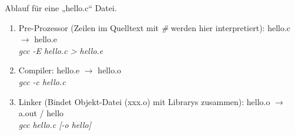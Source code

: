 



\pagestyle{empty}


\begin{multicols*}{3}


Ablauf für eine „hello.c“ Datei.
\begin{enumerate}
\item Pre-Prozessor (Zeilen im Quelltext mit \emph{\#} werden hier interpretiert): hello.c $\rightarrow$ hello.e \\
\emph{gcc -E hello.c > hello.e}
\item Compiler: hello.e $\rightarrow$ hello.o\\
\emph{gcc -c hello.c}
\item Linker (Bindet Objekt-Datei (xxx.o) mit Librarys zusammen): hello.o $\rightarrow$ a.out / hello\\
\emph{gcc hello.c [-o hello]}
\end{enumerate}


\end{multicols*}
